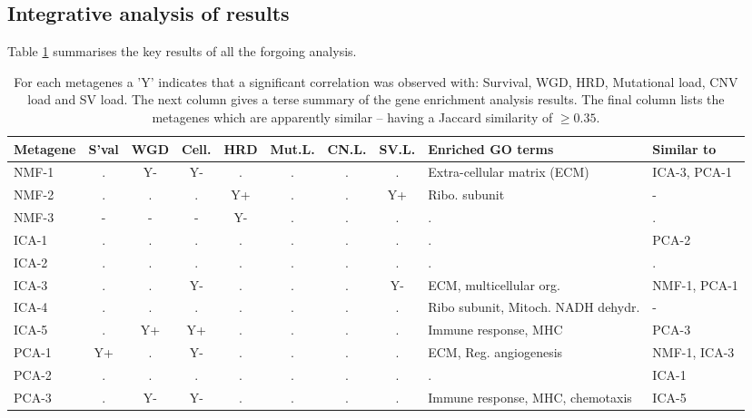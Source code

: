\documentclass[draft,tikz, 12pt,a4paper,oneside,fleqn]{article}
\begin{document}
\FloatBarrier

\subsection{Integrative analysis of results}

Table \ref{tab-integrative-analysis} summarises the key results of all the forgoing analysis.  
 
\begin{table}[htb!]
\begin{center}
\begingroup
\scriptsize
\renewcommand{\arraystretch}{1.4} %
\begin{tabular}{|l||c|c|c|c|c|c|c|l|l|}
\hline
Metagene & S'val & WGD & Cell. & HRD & Mut.L. & CN.L. & SV.L. & Enriched GO terms & Similar to\\
\hline
NMF-1 & . & Y-& Y-& . & . & . & . & Extra-cellular matrix (ECM) & ICA-3, PCA-1 \\
NMF-2 & . & . & . & Y+& . & . & Y+& Ribo. subunit & - \\
NMF-3 & - & - & - & Y-& . & . & . & . & . \\
\hline
ICA-1 & . & . & . & . & . & . & . & . & PCA-2 \\
ICA-2 & . & . & . & . & . & . & . & . & . \\
ICA-3 & . & . & Y-& . & . & . & Y-& ECM, multicellular org. & NMF-1, PCA-1 \\
ICA-4 & . & . & . & . & . & . & . & Ribo subunit, Mitoch. NADH dehydr. & - \\
ICA-5 & . & Y+& Y+& . & . & . & . & Immune response, MHC & PCA-3 \\
\hline
PCA-1 & Y+& . & Y-& . & . & . & . & ECM, Reg. angiogenesis & NMF-1, ICA-3 \\
PCA-2 & . & . & . & . & . & . & . & . & ICA-1 \\
PCA-3 & . & Y-& Y-& . & . & . & . & Immune response, MHC, chemotaxis & ICA-5 \\
\hline
\end{tabular}
\endgroup
\end{center}
\caption{For each metagenes a 'Y' indicates that a significant correlation was observed with: Survival, WGD, HRD, Mutational load,  CNV load and SV load.  The next column gives a terse summary of the gene enrichment analysis results.  The final column lists the metagenes which are apparently similar -- having a Jaccard similarity of $\geq 0.35$.}
\label{tab-integrative-analysis}
\end{table}
\end{document}
